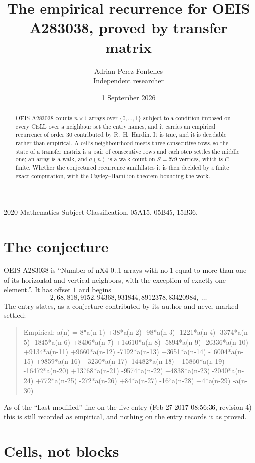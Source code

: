 \documentclass[11pt,a4paper]{article}
\title{The empirical recurrence for OEIS A283038, proved by transfer matrix}
\author{Adrian Perez Fontelles\\ \small Independent researcher}
\date{1 September 2026}
\theoremstyle{plain}
\theoremstyle{definition}
\begin{document}
\maketitle

\begin{abstract}
OEIS A283038 counts $n\times4$ arrays over $\{0,\dots,1\}$ subject to a condition imposed on
every CELL over a neighbour set the entry names, and it carries an empirical recurrence of
order $30$ contributed by R.~H.~Hardin. It is true, and it is decidable rather than
empirical. A cell's neighbourhood meets three consecutive rows, so the state of a transfer
matrix is a pair of consecutive rows and each step settles the middle one; an array is a
walk, and $a(n)$ is a walk count on $S=279$ vertices, which is $C$-finite. Whether the
conjectured recurrence annihilates it is then decided by a finite exact computation, with the
Cayley--Hamilton theorem bounding the work.
\end{abstract}

\noindent\small 2020 Mathematics Subject Classification. 05A15, 05B45, 15B36.\normalsize

\section{The conjecture}

OEIS A283038 is ``Number of nX4 0..1 arrays with no 1 equal to more than one of its horizontal and vertical neighbors, with the exception of exactly one element.''. It has offset $1$ and begins
\[
2, 68, 818, 9152, 94368, 931844, 8912378, 83420984,\ \dots
\]
The entry states, as a conjecture contributed by its author and never marked settled:
\begin{quote}
Empirical: a(n) = 8*a(n-1) +38*a(n-2) -98*a(n-3) -1221*a(n-4) -3374*a(n-5) -1845*a(n-6) +8406*a(n-7) +14610*a(n-8) -5894*a(n-9) -20336*a(n-10) +9134*a(n-11) +9660*a(n-12) -7192*a(n-13) +3651*a(n-14) -16004*a(n-15) +9859*a(n-16) +3230*a(n-17) -14482*a(n-18) +15860*a(n-19) -16472*a(n-20) +13768*a(n-21) -9574*a(n-22) +4838*a(n-23) -2040*a(n-24) +772*a(n-25) -272*a(n-26) +84*a(n-27) -16*a(n-28) +4*a(n-29) -a(n-30)
\end{quote}
As of the ``Last modified'' line on the live entry (Feb 27 2017 08:56:36, revision 4) this is still
recorded as empirical, and nothing on the entry records it as proved.

\section{Cells, not blocks}
\end{document}
